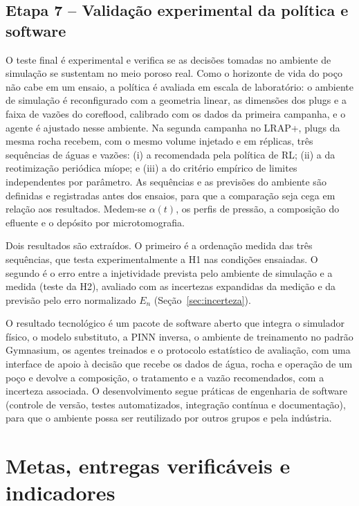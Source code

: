 \documentclass[11pt,a4paper]{article}
\newcommand{\itemedital}[1]{}
\begin{document}
\subsection{Etapa 7 -- Validação experimental da política e software}
O teste final é experimental e verifica se as decisões tomadas no ambiente de simulação se
sustentam no meio poroso real. Como o horizonte de vida do poço não cabe em um ensaio, a
política é avaliada em escala de laboratório: o ambiente de simulação é reconfigurado com a
geometria linear, as dimensões dos plugs e a faixa de vazões do coreflood, calibrado com
os dados da primeira campanha, e o agente é ajustado nesse ambiente. Na segunda campanha
no LRAP+, plugs da mesma rocha recebem, com o mesmo volume injetado e em réplicas, três
sequências de águas e vazões: (i) a recomendada pela política de RL; (ii) a da
reotimização periódica míope; e (iii) a do critério empírico de limites independentes por
parâmetro. As sequências e as previsões do ambiente são definidas e registradas antes dos
ensaios, para que a comparação seja cega em relação aos resultados. Medem-se $\alpha(t)$,
os perfis de pressão, a composição do efluente e o depósito por microtomografia.

Dois resultados são extraídos. O primeiro é a ordenação medida das três sequências, que
testa experimentalmente a H1 nas condições ensaiadas. O segundo é o erro entre a
injetividade prevista pelo ambiente de simulação e a medida (teste da H2), avaliado com as
incertezas expandidas da medição e da previsão pelo erro normalizado $E_n$
(Seção~\ref{sec:incerteza}).

O resultado tecnológico é um pacote de software aberto que integra o simulador físico, o
modelo substituto, a PINN inversa, o ambiente de treinamento no padrão Gymnasium, os
agentes treinados e o protocolo estatístico de avaliação, com uma interface de apoio à
decisão que recebe os dados de água, rocha e operação de um poço e devolve a composição, o
tratamento e a vazão recomendados, com a incerteza associada. O desenvolvimento segue
práticas de engenharia de software (controle de versão, testes automatizados, integração
contínua e documentação), para que o ambiente possa ser reutilizado por outros grupos e
pela indústria.

\section{Metas, entregas verificáveis e indicadores}\itemedital{2.16 XIII, XVI; 6.3.4}
\end{document}
